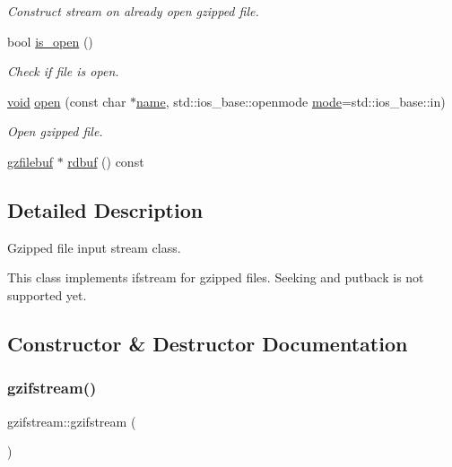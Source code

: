 \begin{DoxyCompactItemize}
\begin{DoxyCompactList}\small\item\em Construct stream on already open gzipped file. \end{DoxyCompactList}\item 
bool \hyperlink{classgzifstream_a8e9de13b311b698ef0ccc276b71c7941}{is\+\_\+open} ()
\begin{DoxyCompactList}\small\item\em Check if file is open. \end{DoxyCompactList}\item 
\hyperlink{lp__lib_8h_ac7828c7b2b31d2e11af17bdb6289c5d9}{void} \hyperlink{classgzifstream_a8105f9300d36dafbe8b10c204583f5a1}{open} (const char $\ast$\hyperlink{lp__lib_8h_a2946c588fc7fa2fa5b43ac54b7872725}{name}, std\+::ios\+\_\+base\+::openmode \hyperlink{ioapi_8h_ab77191763734fbb3e515371393ccb606}{mode}=std\+::ios\+\_\+base\+::in)
\begin{DoxyCompactList}\small\item\em Open gzipped file. \end{DoxyCompactList}\item 
\hyperlink{classgzfilebuf}{gzfilebuf} $\ast$ \hyperlink{classgzifstream_a1c5a0ab4f99f8d8e3406af7bfd82b133}{rdbuf} () const
\end{DoxyCompactItemize}


\subsection{Detailed Description}
Gzipped file input stream class. 

This class implements ifstream for gzipped files. Seeking and putback is not supported yet. 

\subsection{Constructor \& Destructor Documentation}
\mbox{\label{classgzifstream_a6fa19ba2a1eeaeab5f0a408082bc2edd}} 
\subsubsection{\texorpdfstring{gzifstream()}{gzifstream()}\hspace{0.1cm}{\footnotesize\ttfamily [1/3]}}
{\footnotesize\ttfamily gzifstream\+::gzifstream (\begin{DoxyParamCaption}{ }\end{DoxyParamCaption})}


